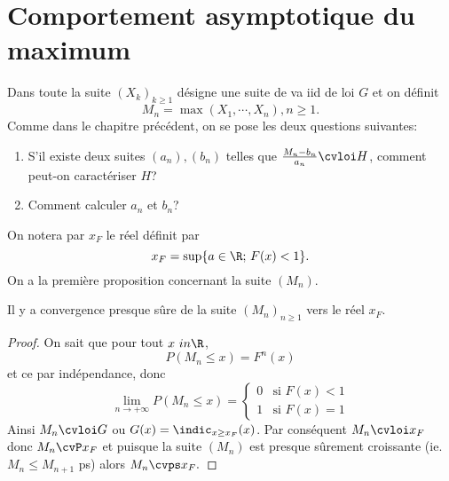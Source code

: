 \documentclass[10p,a4paper,reqno,titlepage]{report}
\begin{document}
\chapter{Comportement asymptotique du maximum}
Dans toute la suite $(X_k)_{k \geq 1}$ désigne une suite de va iid de loi $G$ et on définit
$$ M_n = \max(X_1,\cdots,X_n), n\geq 1.$$
Comme dans le chapitre précédent, on se pose les deux questions suivantes:\
\begin{enumerate}
	\item S'il existe deux suites $(a_n),(b_n) $ telles que $ \frac{M_n - b_n}{a_n}\cvloi H$, comment peut-on caractériser $H$?
	\item Comment calculer $a_n$ et $b_n$?
\end{enumerate}
On notera par $x_F$ le réel définit par 
$$ x_F = \sup\{a \in \R;\,F(x)<1\}.$$
On a la première proposition concernant la suite $(M_n)$. 
\begin{prop}
	Il y a convergence presque sûre de la suite $(M_n)_{n\geq 1}$ vers le réel $x_F$.
\end{prop}
\begin{proof}
	On sait que pour tout $x \ in\R$,
	$$ P(M_n \leq x) = F^n (x)$$
	et ce par indépendance, donc 
	$$ \lim_{n \to + \infty} P(M_n \leq x )= \left\{ \begin{array}{ll} 0 & \text{si } F(x)<1\\1 & \text{si }F(x) =1
	\end{array}\right.$$
Ainsi $M_n \cvloi G$ ou $G(x)= \indic_{x\geq x_F} (x)$. Par conséquent $M_n \cvloi x_F$ donc $M_n \cvP x_F$ et puisque la suite $(M_n)$ est presque sûrement croissante (ie. $M_n \leq M_{n+1}$ ps) alors $M_n \cvps x_F.$
\end{proof}
\end{document}
